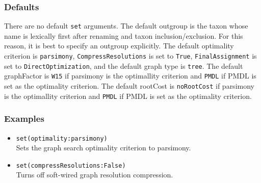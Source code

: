 \documentclass[11pt]{article}
\begin{document}
		\subsubsection{Defaults} 
		There are no default \texttt{set} arguments.  The default outgroup is the taxon whose name  is lexically first after
		renaming and taxon inclusion/exclusion. For this reason, it is best to specify an outgroup explicitly.
		The default optimality criterion is \texttt{parsimony}, \texttt{CompressResolutions} is set to \texttt{True}, \texttt{FinalAssignment} is set to \texttt{DirectOptimization}, and the default graph type is \texttt{tree}.  The default graphFactor is \texttt{W15} if parsimony is the optimallity criterion and \texttt{PMDL} if PMDL is set as the optimality criterion.  The default rootCost
		is \texttt{noRootCost} if  parsimony is the optimallity criterion and \texttt{PMDL} if PMDL is set as the optimality criterion.
		
		\subsubsection{Examples}
			\begin{itemize}
					\item{\texttt{set(optimality:parsimony)}\\Sets the graph search optimality criterion to parsimony.}
					\item{\texttt{set(compressResolutions:False)}\\Turns off soft-wired graph resolution compression.}
			\end{itemize}
		
%		
\end{document}
